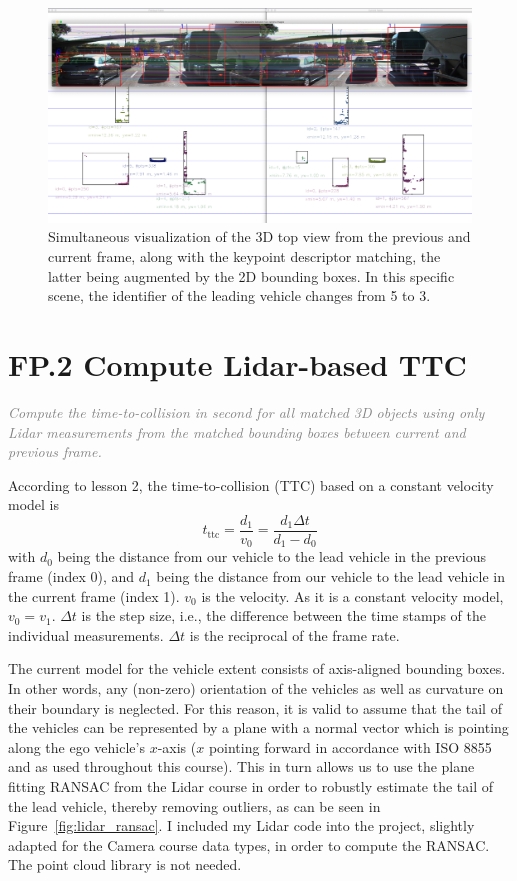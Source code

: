 \documentclass[a4paper]{scrartcl}
\begin{document}
\begin{figure}
	\centering
	\includegraphics[width=0.8\columnwidth]{./img/3D_object_matching}
	\caption{Simultaneous visualization of the 3D top view from the previous and current frame,
		along with the keypoint descriptor matching, the latter being augmented by the
		2D bounding boxes.
		In this specific scene, the identifier of the leading vehicle changes
		from 5 to 3.}
	\label{fig:matching_3d_objects}
\end{figure}

\section*{FP.2 Compute Lidar-based TTC}
\textcolor{gray}{\textit{Compute the time-to-collision in second for all matched 3D objects using only Lidar measurements from the matched bounding boxes between current and previous frame. }}

According to lesson 2, the time-to-collision (TTC) based on a constant velocity model is
\begin{equation}
	t_\text{ttc} = \frac{d_1}{v_0} = \frac{d_1 \Delta t}{d_1 - d_0}
\end{equation}
with $d_0$ being the distance from our vehicle to the lead vehicle in the previous frame (index 0),
and $d_1$ being the distance from our vehicle to the lead vehicle in the current frame (index 1).
$v_0$ is the velocity. As it is a constant velocity model, $v_0 = v_1$.
$\Delta t$ is the step size, i.e., the difference between the time stamps of
the individual measurements. $\Delta t$ is the reciprocal of the frame rate.

The current model for the vehicle extent consists of axis-aligned bounding boxes.
In other words, any (non-zero) orientation of the vehicles as well as
curvature on their boundary is neglected.
For this reason, it is valid to assume that the tail of the vehicles can be represented
by a plane with a normal vector which is pointing along the ego vehicle's $x$-axis
($x$ pointing forward in accordance with ISO 8855 and as used throughout this course).
This in turn allows us to use the plane fitting RANSAC from the Lidar course
in order to robustly estimate the tail of the lead vehicle, thereby removing outliers, as
can be seen in Figure~\ref{fig:lidar_ransac}.
I included my Lidar code into the project, slightly adapted for the Camera course data types, in order
to compute the RANSAC. The point cloud library is not needed.
\end{document}
